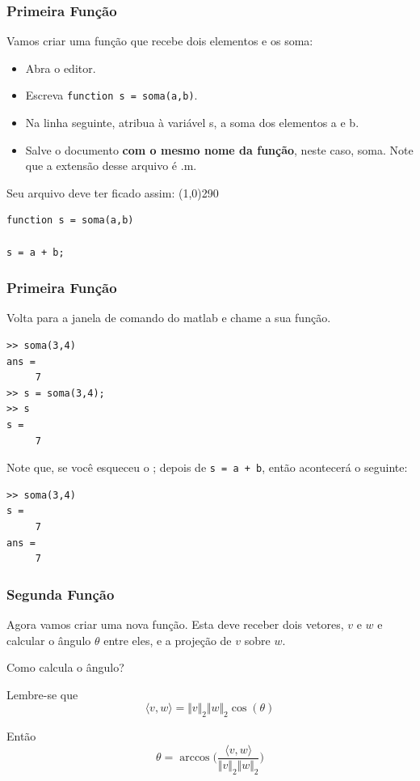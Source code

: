 \documentclass{beamer}
\newcommand{\delim}{\line(1,0){290}}
\newcommand{\norma}[1]{\Vert #1 \Vert_2}
\newcommand{\prodint}[2]{\langle #1,#2 \rangle}
\begin{document}
\begin{frame}[fragile]
 \frametitle{Primeira Fun\c{c}\~ao}

Vamos criar uma fun\c{c}\~ao que recebe dois elementos e os soma:

\begin{itemize}
 \item<1-> Abra o editor.
 \item<2-> Escreva {\tt function s = soma(a,b)}.
 \item<3-> Na linha seguinte, atribua \`a vari\'avel s, a soma dos elementos a e b.
 \item<4-> Salve o documento {\bf com o mesmo nome da fun\c{c}\~ao}, neste caso, soma. Note que a extens\~ao desse arquivo \'e .m.
\end{itemize}
\pause \pause \pause \pause
Seu arquivo deve ter ficado assim:
\delim
\begin{verbatim}
function s = soma(a,b)

s = a + b;
\end{verbatim}

\end{frame}

\begin{frame}[fragile]
\frametitle{Primeira Fun\c{c}\~ao}
Volta para a janela de comando do matlab e chame a sua fun\c{c}\~ao.
\pause
{\scriptsize
\begin{verbatim}
>> soma(3,4)
ans =
     7
>> s = soma(3,4);
>> s
s =
     7
\end{verbatim}}
\pause
Note que, se voc\^e esqueceu o ; depois de {\tt s = a + b}, ent\~ao acontecer\'a o seguinte:
\pause
{\scriptsize
\begin{verbatim}
>> soma(3,4)
s =
     7
ans =
     7
\end{verbatim}}

\end{frame}

\begin{frame}

\frametitle{Segunda Fun\c{c}\~ao}

Agora vamos criar uma nova fun\c{c}\~ao. Esta deve receber dois vetores, $v$ e $w$ e calcular o \^angulo $\theta$ entre eles, e a proje\c{c}\~ao de $v$ sobre $w$.
\pause

Como calcula o \^angulo?
\pause

Lembre-se que
$$\prodint{v}{w} = \norma{v}\norma{w}\cos(\theta)$$
\pause

Ent\~ao
$$\theta = \arccos\bigg(\frac{\prodint{v}{w}}{\norma{v}\norma{w}}\bigg)$$

\end{frame}
\end{document}

